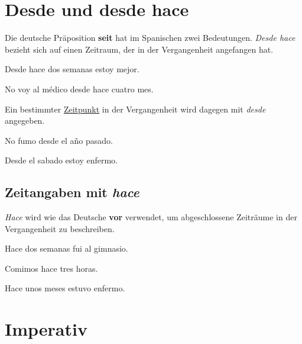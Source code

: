 \section{Desde und desde hace}
Die deutsche Präposition \textbf{seit} hat im Spanischen
zwei Bedeutungen. \textit{Desde hace} bezieht sich auf einen
Zeitraum, der in der Vergangenheit angefangen hat.
\begin{ejemplos}
    \item Desde hace dos semanas estoy mejor.
    \item No voy al m\'edico desde hace cuatro mes.
\end{ejemplos}
Ein bestimmter \underline{Zeitpunkt} in der Vergangenheit
wird dagegen mit \textit{desde} angegeben.
\begin{ejemplos}
    \item No fumo desde el a\~no pasado.
    \item Desde el sabado estoy enfermo.
\end{ejemplos}
\subsection*{Zeitangaben mit \textit{hace}}
\textit{Hace} wird wie das Deutsche \textbf{vor} verwendet,
um abgeschlossene Zeiträume in der Vergangenheit zu beschreiben.
\begin{ejemplos}
    \item Hace dos semanas fui al gimnasio.
    \item Comimos hace tres horas.
    \item Hace unos meses estuvo enfermo.
\end{ejemplos}
\section{Imperativ}
